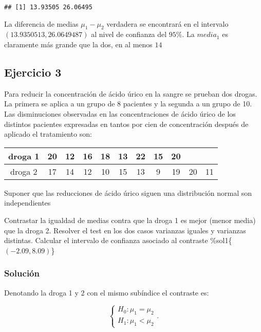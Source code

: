\documentclass[
]{article}
\begin{document}
\begin{verbatim}
## [1] 13.93505 26.06495
\end{verbatim}

La diferencia de medias \(\mu_1-\mu_2\) verdadera se encontrará en el
intervalo \((13.9350513, 26.0649487)\) al nivel de confianza del
\(95\%\). La \(media_1\) es claramente más grande que la dos, en al
menos \(14\)

\hypertarget{ejercicio-3}{%
\subsection{Ejercicio 3}\label{ejercicio-3}}

Para reducir la concentración de ácido úrico en la sangre se prueban dos
drogas. La primera se aplica a un grupo de 8 pacientes y la segunda a un
grupo de 10. Las disminuciones observadas en las concentraciones de
ácido úrico de los distintos pacientes expresadas en tantos por cien de
concentración después de aplicado el tratamiento son:

\begin{center}
\begin{tabular}{|c|c|c|c|c|c|c|c|c|c|c|}
droga 1 & 20 & 12 & 16 & 18 & 13 & 22 & 15 & 20\\ \hline droga 2 & 17 & 14 & 12 & 10 & 15 &
13 & 9 & 19 & 20 & 11
\end{tabular}
\end{center}

Suponer que las reducciones de ácido úrico siguen una distribución
normal son independientes

Contrastar la igualdad de medias contra que la droga 1 es mejor (menor
media) que la droga 2. Resolver el test en los dos casos varianzas
iguales y varianzas distintas. Calcular el intervalo de confianza
asociado al contraste \%sol1\{\(\left(-2.09,8.09\right)\)\}

\hypertarget{soluciuxf3n-2}{%
\subsubsection{Solución}\label{soluciuxf3n-2}}

Denotando la droga 1 y 2 con el mismo subíndice el contraste es:

\[
\left\{
\begin{array}{ll}
H_{0}:\mu_1=\mu_2\\
H_{1}:\mu_1 < \mu_2 
\end{array}
\right..
\]
\end{document}
